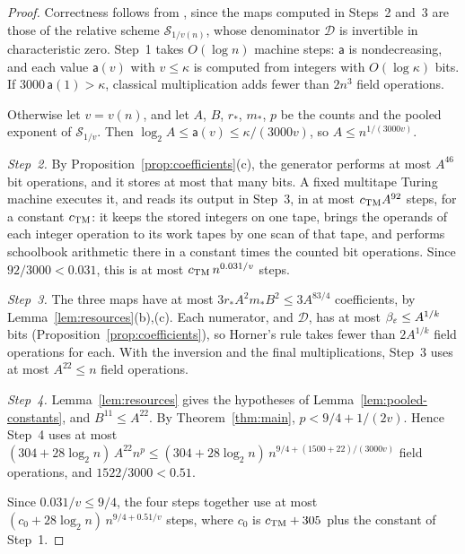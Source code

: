 \begin{proof}
Correctness follows from \citep[Lemma~2.4]{FinCon26}, since the maps
computed in Steps~2 and~3 are those of the relative scheme
\(\mathcal S_{1/v(n)}\), whose denominator \(\mathcal D\) is invertible in
characteristic zero. Step~1 takes \(O(\log n)\) machine steps: \(\mathsf a\)
is nondecreasing, and each value \(\mathsf a(v)\) with \(v\le\kappa\) is
computed from integers with \(O(\log\kappa)\) bits. If
\(3000\,\mathsf a(1)>\kappa\), classical multiplication adds fewer than
\(2n^3\) field operations.

Otherwise let \(v=v(n)\), and let \(A\), \(B\), \(r_*\), \(m_*\), \(p\) be
the counts and the pooled exponent of \(\mathcal S_{1/v}\). Then
\(\log_2A\le\mathsf a(v)\le\kappa/(3000v)\), so \(A\le n^{1/(3000v)}\).

\emph{Step~2.} By Proposition~\ref{prop:coefficients}(c), the generator
performs at most \(A^{46}\) bit operations, and it stores at most that
many bits. A fixed multitape Turing machine executes it, and reads its
output in Step~3, in at most \(c_{\rm TM}A^{92}\) steps, for a constant
\(c_{\rm TM}\): it keeps the
stored integers on one tape, brings the operands of each integer operation
to its work tapes by one scan of that tape, and performs schoolbook
arithmetic there in a constant times the counted bit operations. Since
\(92/3000<0.031\), this is at most \(c_{\rm TM}\,n^{0.031/v}\) steps.

\emph{Step~3.} The three maps have at most
\(3r_*A^2m_*B^2\le3A^{83/4}\) coefficients, by
Lemma~\ref{lem:resources}(b),(c). Each numerator, and \(\mathcal D\), has
at most \(\beta_\varepsilon\le A^{1/k}\) bits
(Proposition~\ref{prop:coefficients}), so Horner's rule takes fewer than
\(2A^{1/k}\) field operations for each. With the inversion and the final
multiplications, Step~3 uses at most \(A^{22}\le n\) field operations.

\emph{Step~4.} Lemma~\ref{lem:resources} gives the hypotheses of
Lemma~\ref{lem:pooled-constants}, and \(B^{11}\le A^{22}\). By
Theorem~\ref{thm:main}, \(p<9/4+1/(2v)\). Hence Step~4 uses at most
\((304+28\log_2n)\,A^{22}n^p\le(304+28\log_2n)\,n^{9/4+(1500+22)/(3000v)}\)
field operations, and \(1522/3000<0.51\).

Since \(0.031/v\le9/4\), the four steps together use at most
\((c_0+28\log_2n)\,n^{9/4+0.51/v}\) steps, where \(c_0\) is
\(c_{\rm TM}+305\) plus the constant of Step~1.


\end{proof}

